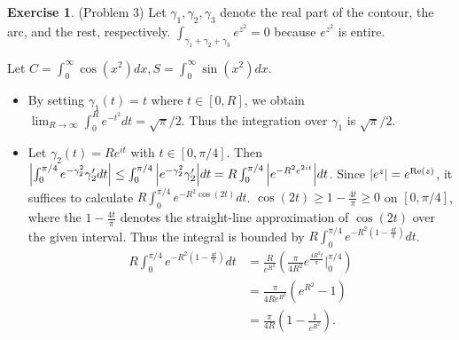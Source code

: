 \documentclass[12pt, psamsfonts]{amsart}
\theoremstyle{definition}
\newtheorem*{exer}{Exercise}
\theoremstyle{remark}
\numberwithin{equation}{section}
\begin{document}
\begin{exer}{(Problem 3)}
  Let $\gamma_1, \gamma_2, \gamma_3$ denote the real part of the contour, the arc, and the rest, respectively.
  $\int_{\gamma_1 + \gamma_2 + \gamma_3} e^{z^2} = 0$ because $e^{z^2}$ is entire.

  Let $C = \int_{0}^{\infty} \cos(x^2) dx, S = \int_{0}^{\infty} \sin(x^2) dx$.

  \begin{itemize}
    \item
      By setting $\gamma_1(t) = t$ where $t \in [0, R]$, we obtain $\lim_{R \rightarrow \infty} \int_{0}^{R} e^{-t^2} dt = \sqrt{\pi} / 2$.
      Thus the integration over $\gamma_1$ is $\sqrt{\pi} / 2$.
    \item
      Let $\gamma_2(t) = Re^{it}$ with $t \in [0, \pi / 4]$.
      Then $\abs{\int_0^{\pi/4} e^{-\gamma_2^2} \gamma_2' dt} \leq \int_0^{\pi/4} \abs{e^{-\gamma_2^2} \gamma_2'} dt = R\int_{0}^{\pi/4} \abs{e^{-R^2e^{2it}}} dt$.
      Since $\abs{e^z} = e^{\Re(z)}$, it suffices to calculate $R\int_{0}^{\pi / 4} e^{-R^2\cos(2t)} dt$.
      $\cos(2t) \geq 1 - \frac{4t}{\pi} \geq 0$ on $[0, \pi / 4]$, where the $1 - \frac{4t}{\pi}$ denotes the straight-line approximation of $\cos(2t)$ over the given interval.
      Thus the integral is bounded by $R\int_{0}^{\pi / 4}e^{-R^2(1-\frac{4t}{\pi})} dt$.
      \begin{align*}
        R\int_{0}^{\pi / 4}e^{-R^2(1-\frac{4t}{\pi})} dt
          &= \frac{R}{e^{R^2}} (\frac{\pi}{4R^2}e^{\frac{4R^2t}{\pi}} \Big\vert^{\pi/4}_0) \\
          &= \frac{\pi}{4Re^{R^2}} (e^{R^2} - 1) \\
          &= \frac{\pi}{4R} (1 - \frac{1}{e^{R^2}}).
      \end{align*}


\end{itemize}
\end{exer}
\end{document}
